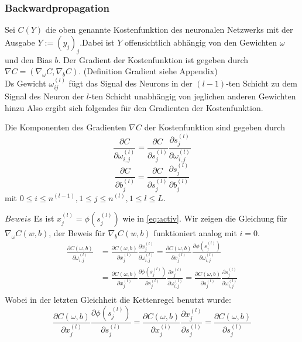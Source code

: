 \subsubsection{Backwardpropagation}
Sei $C(Y)$ die oben genannte Kostenfunktion des neuronalen Netzwerks mit der Ausgabe $Y:=(y_j)_j$.Dabei ist $Y$
offensichtlich abhängig von den Gewichten $\omega$ und den Bias $b$. Der Gradient der Kostenfunktion ist gegeben durch
$\nabla C=(\nabla_{\omega}C,\nabla_{b}C).$  (Definition Gradient siehe Appendix)\\
Ds Gewicht $\omega_{ij}^{(l)}$ fügt das Signal des Neurons in der $(l-1)$-ten Schicht zu dem Signal des Neuron der $l$-ten
Schicht unabhängig von jeglichen anderen Gewichten hinzu Also ergibt sich folgendes für den Gradienten der
Kostenfunktion.
\begin{satz}
    \label{machine-cost-grad}
    Die Komponenten des Gradienten $\nabla C$ der Kostenfunktion sind gegeben durch
    \[
        \frac{\partial C}{\partial \omega_{i,j}^{(l)}} = \frac{\partial C}{\partial s_{j}^{(l)}} \frac{\partial s_{j}^{(l)}}{\partial \omega_{i,j}^{(l)}}
    \]
    \[
        \frac{\partial C}{\partial b_{j}^{(l)}} = \frac{\partial C}{\partial s_{j}^{(l)}} \frac{\partial s_{j}^{(l)}}{\partial b_j^{(l)}}
    \]
    mit $0\leq i \leq n^{(l-1)}, 1\leq j \leq n^{(l)}, 1 \leq l \leq L$.
\end{satz}
$Beweis$ Es ist $x_j^{(l)}=\phi(s_j^{(l)})$ wie in \eqref{eq:activ}. Wir zeigen die Gleichung für
$\nabla_{\omega}C(w,b)$, der Beweis für  $\nabla_{b}C(w,b)$ funktioniert analog mit $i=0$.
\begin{align*}
    \frac{\partial C(\omega,b)}{\partial \omega_{i,j}^{(l)}} &= \frac{\partial C(\omega,b)}{\partial x_j^{(l)}} \frac{\partial x_j^{(l)}}{\partial \omega_{i,j}^{(l)}}
    = \frac{\partial C(\omega,b)}{\partial x_j^{(l)}} \frac{\partial \phi(s_j^{(l)})}{\partial \omega_{i,j}^{(l)}} \\
    &=\frac{\partial C(\omega,b)}{\partial x_j^{(l)}} \frac{\partial \phi(s_j^{(l)})}{\partial s_j^{(l)}} \frac{\partial s_j^{(l)}}{\partial \omega_{i,j}^{(l)}}
    = \frac{\partial C(\omega,b)}{\partial s_{j}^{(l)}} \frac{\partial s_{j}^{(l)}}{\partial \omega_{i,j}^{(l)}} \\
\end{align*}
Wobei in der letzten Gleichheit die Kettenregel benutzt wurde:
\[
    \frac{\partial C(\omega,b)}{\partial x_j^{(l)}} \frac{\partial \phi(s_j^{(l)})}{\partial s_j^{(l)}}
    = \frac{\partial C(\omega,b)}{\partial x_j^{(l)}} \frac{\partial x_j^{(l)}}{\partial s_j^{(l)}}
    = \frac{\partial C(\omega,b)}{\partial s_j^{(l)}}
\]
